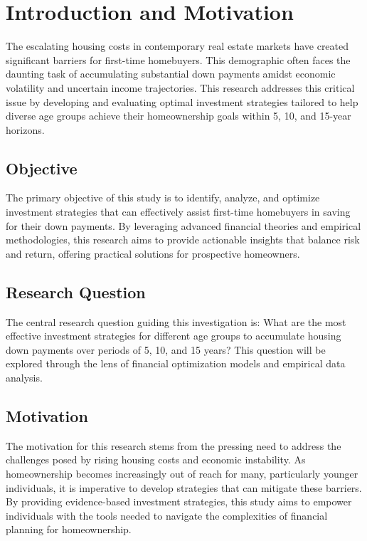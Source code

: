 \section{Introduction and Motivation}
The escalating housing costs in contemporary real estate markets have created significant barriers for first-time homebuyers. This demographic often faces the daunting task of accumulating substantial down payments amidst economic volatility and uncertain income trajectories. This research addresses this critical issue by developing and evaluating optimal investment strategies tailored to help diverse age groups achieve their homeownership goals within 5, 10, and 15-year horizons.

\subsection{Objective}
The primary objective of this study is to identify, analyze, and optimize investment strategies that can effectively assist first-time homebuyers in saving for their down payments. By leveraging advanced financial theories and empirical methodologies, this research aims to provide actionable insights that balance risk and return, offering practical solutions for prospective homeowners.

\subsection{Research Question}
The central research question guiding this investigation is: What are the most effective investment strategies for different age groups to accumulate housing down payments over periods of 5, 10, and 15 years? This question will be explored through the lens of financial optimization models and empirical data analysis.

\subsection{Motivation}
The motivation for this research stems from the pressing need to address the challenges posed by rising housing costs and economic instability. As homeownership becomes increasingly out of reach for many, particularly younger individuals, it is imperative to develop strategies that can mitigate these barriers. By providing evidence-based investment strategies, this study aims to empower individuals with the tools needed to navigate the complexities of financial planning for homeownership.

